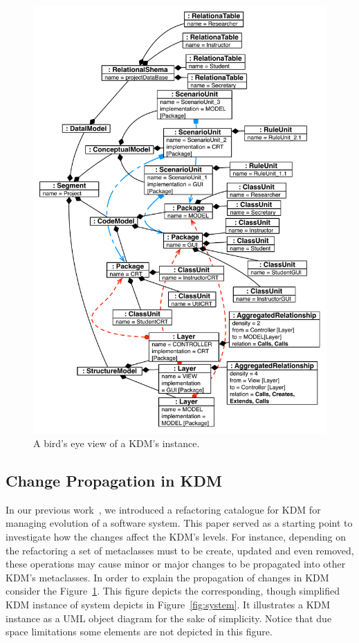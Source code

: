 \begin{figure}
	\centering
	\includegraphics[scale=0.53]{figuras/TreeNewJoint}
	\caption{A bird's eye view of a KDM's instance.}
	\label{fig:allKDMLayers}
\end{figure}

\subsection{Change Propagation in KDM} %
\label{sub:change_propagation_in_kdm}

In our previous work~\cite{IRIDurelliCatalogo}, we introduced a refactoring catalogue for KDM for managing evolution of a software system. This paper served as a starting point to investigate how the changes affect the KDM's levels. For instance, depending on the refactoring a set of metaclasses must to be create, updated and even removed, these operations may cause minor or major changes to be propagated into other KDM's metaclasses. In order to explain the propagation of changes in KDM consider the Figure~\ref{fig:allKDMLayers}. This figure depicts the corresponding, though simplified KDM instance of system depicts in Figure~\ref{fig:system}. It illustrates a KDM instance as a UML object diagram for the sake of simplicity. Notice that due space limitations some elements are not depicted in this figure.

